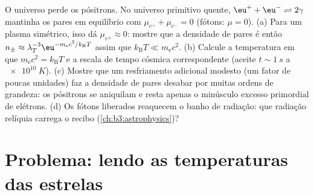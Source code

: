 \begin{exercise}[$\star\star\star$]\label{exo:b3:grand-canonical:12}
O universo perde os pósitrons. No universo primitivo quente,
$\eu^+ + \eu^- \rightleftharpoons 2\gamma$ mantinha os pares em
equilíbrio com $\mu_{e^+} + \mu_{e^-} = 0$ (fótons: $\mu = 0$).
(a) Para um plasma simétrico, isso dá $\mu_{e^\pm} \approx 0$:
mostre que a densidade de pares é então $n_\pm \approx
\lambda_T^{-3}\eu^{-m_{\text{e}}c^2/k_{\text{B}}T}$ assim que
$k_{\text{B}}T \ll m_{\text{e}}c^2$. (b) Calcule a temperatura
em que $m_{\text{e}}c^2 = k_{\text{B}}T$ e a escala de tempo cósmica
correspondente (aceite $t \sim \qty{1}{s}$ a
$\qty{e10}{K}$). (c) Mostre que um resfriamento adicional modesto (um
fator de poucas unidades) faz a densidade de pares desabar por muitas
ordens de grandeza: os pósitrons se aniquilam e resta apenas o
minúsculo excesso primordial de elétrons. (d) Os fótons liberados
reaquecem o banho de radiação: que radiação relíquia carrega o recibo
(\cref{ch:b3:astrophysics})?
\end{exercise}

\section{Problema: lendo as temperaturas das estrelas}

